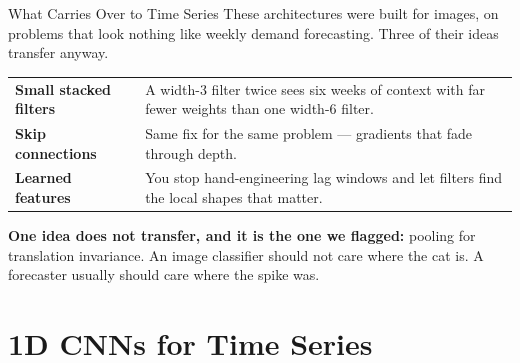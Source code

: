 \documentclass[aspectratio=169, 11pt]{beamer}
\begin{document}
\begin{frame}{What Carries Over to Time Series}
  These architectures were built for images, on problems that look nothing like weekly demand
  forecasting. Three of their ideas transfer anyway.

  \vspace{0.1cm}
  \begin{center}
    {\small
    \begin{tabular}{p{3.6cm}p{8.8cm}}
      \toprule
      \textbf{Small stacked filters} & A width-3 filter twice sees six weeks of context with far
      fewer weights than one width-6 filter. \\[3pt]
      \textbf{Skip connections} & Same fix for the same problem --- gradients that fade through
      depth. \\[3pt]
      \textbf{Learned features} & You stop hand-engineering lag windows and let filters find the
      local shapes that matter. \\
      \bottomrule
    \end{tabular}
    }
  \end{center}

  \vspace{0.1cm}
  \textbf{One idea does not transfer, and it is the one we flagged:} pooling for translation
  invariance. An image classifier should not care where the cat is. A forecaster usually should
  care where the spike was.
\end{frame}

\section{1D CNNs for Time Series}

\end{document}
